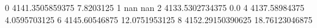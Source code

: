 0 4141.3505859375 7.8203125
1 nan nan
2 4133.5302734375 0.0
4 4137.58984375 4.0595703125
6 4145.60546875 12.0751953125
8 4152.29150390625 18.76123046875
